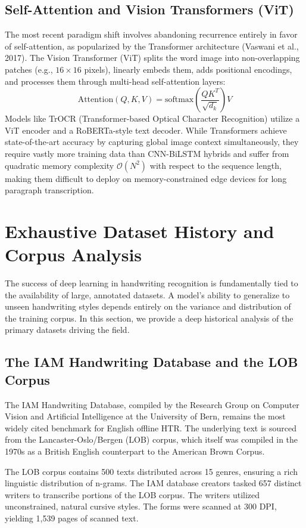 \subsection{Self-Attention and Vision Transformers (ViT)}
The most recent paradigm shift involves abandoning recurrence entirely in favor of self-attention, as popularized by the Transformer architecture (Vaswani et al., 2017). The Vision Transformer (ViT) splits the word image into non-overlapping patches (e.g., $16 \times 16$ pixels), linearly embeds them, adds positional encodings, and processes them through multi-head self-attention layers:
\begin{equation}
    \text{Attention}(Q, K, V) = \text{softmax}\left(\frac{QK^T}{\sqrt{d_k}}\right)V
\end{equation}
Models like TrOCR (Transformer-based Optical Character Recognition) utilize a ViT encoder and a RoBERTa-style text decoder. While Transformers achieve state-of-the-art accuracy by capturing global image context simultaneously, they require vastly more training data than CNN-BiLSTM hybrids and suffer from quadratic memory complexity $\mathcal{O}(N^2)$ with respect to the sequence length, making them difficult to deploy on memory-constrained edge devices for long paragraph transcription.

\section{Exhaustive Dataset History and Corpus Analysis}
The success of deep learning in handwriting recognition is fundamentally tied to the availability of large, annotated datasets. A model's ability to generalize to unseen handwriting styles depends entirely on the variance and distribution of the training corpus. In this section, we provide a deep historical analysis of the primary datasets driving the field.

\subsection{The IAM Handwriting Database and the LOB Corpus}
The IAM Handwriting Database, compiled by the Research Group on Computer Vision and Artificial Intelligence at the University of Bern, remains the most widely cited benchmark for English offline HTR. The underlying text is sourced from the Lancaster-Oslo/Bergen (LOB) corpus, which itself was compiled in the 1970s as a British English counterpart to the American Brown Corpus.

The LOB corpus contains 500 texts distributed across 15 genres, ensuring a rich linguistic distribution of n-grams. The IAM database creators tasked 657 distinct writers to transcribe portions of the LOB corpus. The writers utilized unconstrained, natural cursive styles. The forms were scanned at 300 DPI, yielding 1,539 pages of scanned text. 

